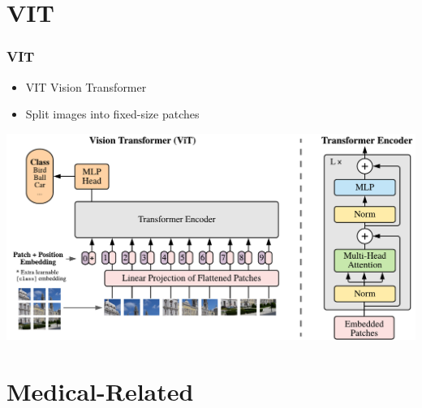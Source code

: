 \documentclass[]{beamer}
\begin{document}
\section{VIT}
\begin{frame}
    \frametitle{VIT}
    \begin{itemize}
        \item VIT\: Vision Transformer
        \item Split images into fixed-size patches
    \end{itemize}
    \centering
    \includegraphics[scale = 0.4]{model_scheme.pdf}
\end{frame}

\section{Medical-Related}
\end{document}
